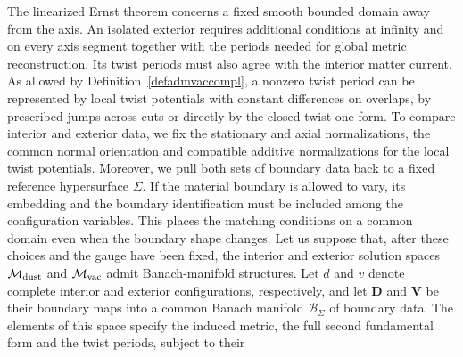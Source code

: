 \documentclass[amsmath,amsfonts,amssymb,aps,pra,superscriptaddress,10pt]{revtex4-2}
\numberwithin{equation}{section}
\theoremstyle{plain}
\theoremstyle{definition}
\theoremstyle{remark}
\theoremstyle{definition}
\begin{document}
The linearized Ernst theorem concerns a fixed smooth bounded domain away from the axis. An isolated exterior requires additional conditions at infinity and on every axis segment together with the periods needed for global metric reconstruction. Its twist periods must also agree with the interior matter current. As allowed by Definition~\ref{defadmvaccompl}, a nonzero twist period can be represented by local twist potentials with constant differences on overlaps, by prescribed jumps across cuts or directly by the closed twist one-form. To compare interior and exterior data, we fix the stationary and axial normalizations, the common normal orientation and compatible additive normalizations for the local twist potentials. Moreover, we pull both sets of boundary data back to a fixed reference hypersurface $\Sigma$. If the material boundary is allowed to vary, its embedding and the boundary identification must be included among the configuration variables. This places the matching conditions on a common domain even when the boundary shape changes. Let us suppose that, after these choices and the gauge have been fixed, the interior and exterior solution spaces $\mathcal{M}_{\rm{dust}}$ and $\mathcal{M}_{\rm{vac}}$ admit Banach-manifold structures. Let $d$ and $v$ denote complete interior and exterior configurations, respectively, and let $\mathbf{D}$ and $\mathbf{V}$ be their boundary maps into a common Banach manifold $\mathcal{B}_\Sigma$ of boundary data. The elements of this space specify the induced metric, the full second fundamental form and the twist periods, subject to their
\end{document}
